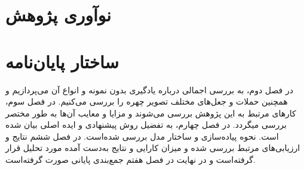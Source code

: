 \section{نوآوری پژوهش}
\section{ساختار پایان‌نامه}
در فصل دوم، به بررسی اجمالی درباره یادگیری بدون نمونه و انواع آن  می‌پردازیم و همچنین حملات و جعل‌های مختلف تصویر چهره را بررسی می‌کنیم. در فصل سوم، کارهای مرتبط به این پژوهش بررسی می‌شوند و مزایا و معایب آن‌ها به طور مختصر بررسی میگردد. در فصل چهارم، به تفضیل روش پیشنهادی و ایده اصلی بیان شده است. نحوه پیاده‌سازی و ساختار مدل بررسی شده‌است. در فصل ششم نتایج و ارزیابی‌های مرتبط بررسی شده و میزان کارایی و نتایج به‌دست آمده مورد تحلیل قرار گرفته‌است و در نهایت در فصل هفتم جمع‌بندی پایانی صورت گرفته‌است.

